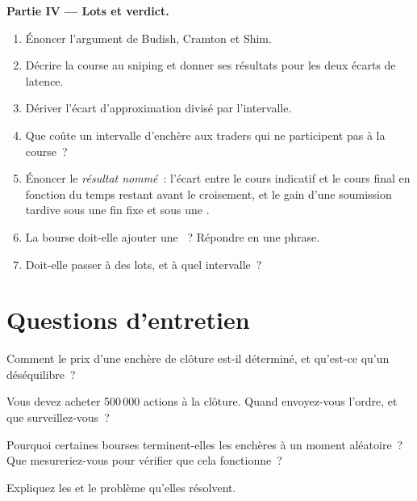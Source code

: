 \begin{problem}
\medskip\noindent\textbf{Partie IV --- Lots et verdict.}
\begin{enumerate}[resume]
\item Énoncer l'argument de Budish, Cramton et Shim.
\item Décrire la course au sniping et donner ses résultats pour les deux écarts de latence.
\item Dériver l'écart d'approximation divisé par l'intervalle.
\item Que coûte un intervalle d'enchère aux traders qui ne participent pas à la course~?
\item Énoncer le \emph{résultat nommé}~: l'écart entre le cours indicatif et le cours final en fonction du temps restant avant le croisement, et le gain d'une soumission tardive
sous une fin fixe et sous une .
\item La bourse doit-elle ajouter une ~? Répondre en une phrase.
\item Doit-elle passer à des lots, et à quel intervalle~?
\end{enumerate}
\end{problem}

\section{Questions d'entretien}

\begin{interviewq}\label{iq:mx:auction-mechanics-and-theory:1}
Comment le prix d'une enchère de clôture est-il déterminé, et qu'est-ce qu'un déséquilibre~?
\end{interviewq}

\begin{interviewq}\label{iq:mx:auction-mechanics-and-theory:2}
Vous devez acheter 500\,000 actions à la clôture. Quand envoyez-vous l'ordre, et que surveillez-vous~?
\end{interviewq}

\begin{interviewq}\label{iq:mx:auction-mechanics-and-theory:3}
Pourquoi certaines bourses terminent-elles les enchères à un moment aléatoire~? Que mesureriez-vous pour vérifier que cela fonctionne~?
\end{interviewq}

\begin{interviewq}\label{iq:mx:auction-mechanics-and-theory:4}
Expliquez les  et le problème qu'elles résolvent.
\end{interviewq}


